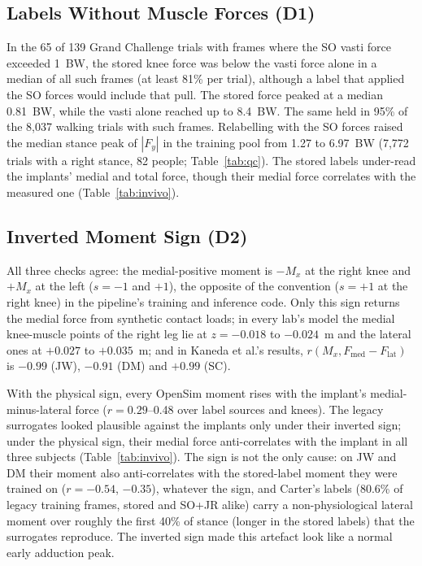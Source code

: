 \subsection{Labels Without Muscle Forces (D1)}\label{sec:res-d1}
In the 65 of 139 Grand Challenge trials with frames where the SO vasti force exceeded 1~BW, the
stored knee force was below the vasti force alone in a median of all such frames (at least 81\%
per trial), although a label that applied the SO forces would include that pull. The stored force
peaked at a median 0.81~BW, while the vasti alone reached up to 8.4~BW. The same held in 95\% of
the 8,037 walking trials with such frames. Relabelling with the SO forces raised the median stance
peak of $|F_y|$ in the training pool from 1.27 to 6.97~BW (7,772 trials with a right stance, 82
people; Table~\ref{tab:qc}). The stored labels under-read the implants' medial and total force,
though their medial force correlates with the measured one (Table~\ref{tab:invivo}).

\subsection{Inverted Moment Sign (D2)}\label{sec:res-d2}
All three checks agree: the medial-positive moment is $-M_x$ at the right knee and $+M_x$ at the
left ($s = -1$ and $+1$), the opposite of the convention ($s = +1$ at the right knee) in the
pipeline's training and inference code. Only this sign returns the medial force from synthetic
contact loads; in every lab's model the medial knee-muscle points of the right leg lie at $z =
-0.018$ to $-0.024$~m and the lateral ones at $+0.027$ to $+0.035$~m; and in Kaneda et al.'s
results, $r(M_x, F_{\mathrm{med}} - F_{\mathrm{lat}})$ is $-0.99$ (JW), $-0.91$ (DM) and $+0.99$
(SC).

With the physical sign, every OpenSim moment rises with the implant's medial-minus-lateral force
($r = 0.29$--0.48 over label sources and knees). The legacy surrogates looked plausible against the
implants only under their inverted sign; under the physical sign, their medial force
anti-correlates with the implant in all three subjects (Table~\ref{tab:invivo}). The sign is not
the only cause: on JW and DM their moment also anti-correlates with the stored-label moment they
were trained on ($r = -0.54$, $-0.35$), whatever the sign, and Carter's labels (80.6\% of legacy
training frames, stored and SO+JR alike) carry a non-physiological lateral moment over roughly the
first 40\% of stance (longer in the stored labels) that the surrogates reproduce. The inverted sign
made this artefact look like a normal early adduction peak.

